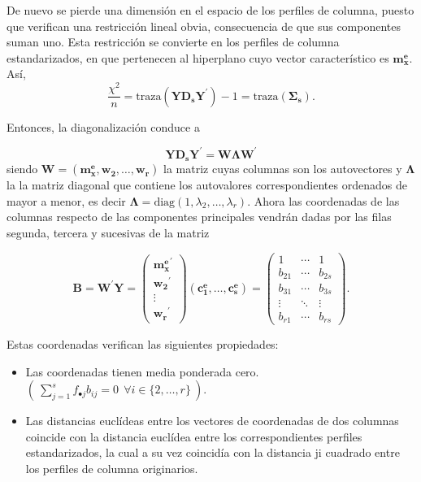 \documentclass[
  a4paper,
  oneside]{scrbook}
\theoremstyle{definition}
\theoremstyle{definition}
\theoremstyle{definition}
\theoremstyle{definition}
\theoremstyle{remark}
\begin{document}
De nuevo se pierde una dimensión en el espacio de los perfiles de
columna, puesto que verifican una restricción lineal obvia, consecuencia
de que sus componentes suman uno. Esta restricción se convierte en los
perfiles de columna estandarizados, en que pertenecen al hiperplano cuyo
vector característico es \(\bm{m_x^e}\). Así, \[\frac{\chi^2}{n}
=\mbox{traza} \left(\bm{Y D_s Y^{\prime}}\right)-1
=\mbox{traza} \left(\bm{\Sigma_s}\right).\]

Entonces, la diagonalización conduce a

\[\bm{Y D_s Y^{\prime}}=\bm{W}\bm{\Lambda} \bm{W}^{\prime}\] siendo
\(\bm{W}=\left( \bm{m_x^e}, \bm{w_2}, \ldots, \bm{w_r}\right)\) la matriz
cuyas columnas son los autovectores y \(\bm{\Lambda}\) la la matriz
diagonal que contiene los autovalores correspondientes ordenados de
mayor a menor, es decir
\(\bm{\Lambda}=\mbox{diag} \left(1,\lambda_2,\ldots,\lambda_r \right)\).
Ahora las coordenadas de las columnas respecto de las componentes
principales vendrán dadas por las filas segunda, tercera y sucesivas de
la matriz

\[\bm{B}=\bm{W}^{\prime}\bm{Y}
=\left(\begin{array}{c} {\bm{m_x^e}}^{\prime} \\ \bm{w_2}^{\prime} \\ \vdots \\ \bm{w_r}^{\prime} \end{array} \right)
 \left(\bm{c_1^e}, \ldots, \bm{c_s^e} \right)
=\left(\begin{array}{ccc}
1& \cdots & 1 \\
b_{21} & \cdots & b_{2s} \\
b_{31} & \cdots & b_{3s} \\
\vdots & \ddots & \vdots \\
b_{r1} & \cdots & b_{rs} \end{array}\right).\]

Estas coordenadas verifican las siguientes propiedades:

\begin{itemize}
\item
  Las coordenadas tienen media ponderada cero.
  \(\left(\ \sum_{j=1}^s f_{\bullet j} b_{ij}=0\ \ \forall i\in\{2,\ldots,r\}\ \right).\)
\item
  Las distancias euclídeas entre los vectores de coordenadas de dos
  columnas coincide con la distancia euclídea entre los
  correspondientes perfiles estandarizados, la cual a su vez coincidía
  con la distancia ji cuadrado entre los perfiles de columna
  originarios.
\end{itemize}
\end{document}
